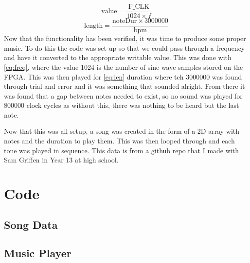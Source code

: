 \documentclass[a4paper, 12pt]{article}
\begin{document}
		\par
			\begin{equation}
				\label{eq:freq}
				\text{value} = \frac{\text{F\_CLK}}{1024 \times f}
			\end{equation}
			\begin{equation}
				\label{eq:len}
				\text{length} = \frac{\text{noteDur} \times 3000000}{\text{bpm}}
			\end{equation}
		Now that the functionality has been verified, it was time to produce some proper music. To do this the code was set up so that we could pass through a frequency and have it converted to the appropriate writable value. This was done with \cref{eq:freq}, where the value 1024 is the number of sine wave samples stored on the FPGA. This was then played for \cref{eq:len} duration where teh 3000000 was found through trial and error and it was something that sounded alright. From there it was found that a gap between notes needed to exist, so no sound was played for 800000 clock cycles as without this, there was nothing to be heard but the last note.
		\par
		Now that this was all setup, a song was created in the form of a 2D array with notes and the duration to play them. This was then looped through and each tone was played in sequence. This data is from a github repo that I made with Sam Griffen in Year 13 at high school.
	\section{Code}
		\subsection{Song Data}
			
		\subsection{Music Player}
			



\end{document}
